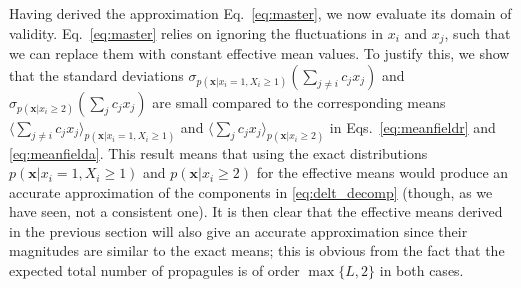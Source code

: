 \documentclass[12pt]{article}
\begin{document}
Having derived the approximation Eq.~\eqref{eq:master}, we now evaluate its domain of validity. Eq.~\eqref{eq:master} relies on ignoring the fluctuations in $x_i$ and $x_j$, such that we can replace them with constant effective mean values. To justify this, we show that the standard deviations $\sigma_{p({\mathbf x}|x_i=1,X_i\geq 1)}(\sum_{j\neq i} c_j x_j)$ and $\sigma_{p({\mathbf x}|x_i\geq 2)}(\sum_j c_j x_j)$ are small compared to the corresponding means $\langle\sum_{j\neq i} c_j x_j\rangle_{p({\mathbf x}|x_i=1,X_i\geq 1)}$ and $\langle\sum_j c_j x_j\rangle_{p({\mathbf x}|x_i\geq 2)}$ in Eqs.~\eqref{eq:meanfieldr} and \eqref{eq:meanfielda}. This result means that using the exact distributions $p({\mathbf x}|x_i=1,X_i\geq 1)$ and $p({\mathbf x}|x_i\geq 2)$ for the effective means would produce an accurate approximation of the components in \eqref{eq:delt_decomp} (though, as we have seen, not a consistent one). It is then clear that the effective means derived in the previous section will also give an accurate approximation since their magnitudes are similar to the exact means; this is obvious from the fact that the expected total number of propagules is of order $\max\{L,2\}$ in both cases.
\end{document}
